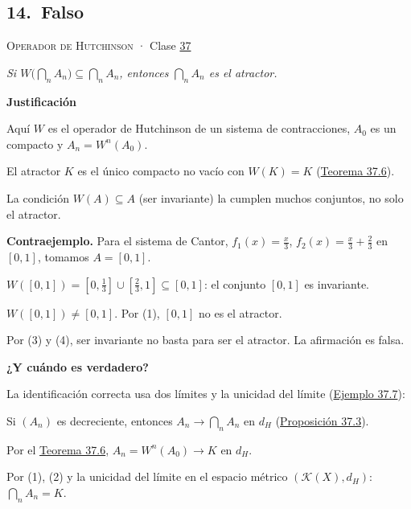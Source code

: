 \documentclass[11pt,a4paper]{article}
\newcommand{\bloque}[1]{\par\smallskip\noindent\textbf{\color{acento}#1}\par}
\begin{document}
\subsection*{\hypertarget{r-14}{}14.\ \textcolor{bad}{Falso}}
{\small \textsc{Operador de Hutchinson} · Clase \href{https://decostruttivismo.github.io/MAT2514-repaso/pdf/MAT2514_apuntes_completos.pdf\#nameddest=section.37}{37}}\par
\emph{Si $W\bigl(\bigcap_nA_n\bigr)\subseteq\bigcap_nA_n$, entonces $\bigcap_nA_n$ es el atractor.}
\bloque{Justificación}
\begin{pasos}
\item[] Aquí $W$ es el operador de Hutchinson de un sistema de contracciones, $A_0$ es un compacto y $A_n=W^n(A_0)$.
\item[(1)] El atractor $K$ es el único compacto no vacío con $W(K)=K$ (\href{https://decostruttivismo.github.io/MAT2514-repaso/pdf/MAT2514_apuntes_completos.pdf\#nameddest=teorema.37.6}{Teorema 37.6}).
\item[(2)] La condición $W(A)\subseteq A$ (ser invariante) la cumplen muchos conjuntos, no solo el atractor.
\item[] \textbf{Contraejemplo.} Para el sistema de Cantor, $f_1(x)=\frac x3$, $f_2(x)=\frac x3+\frac23$ en $[0,1]$, tomamos $A=[0,1]$.
\item[(3)] $W([0,1])=[0,\frac13]\cup[\frac23,1]\subseteq[0,1]$: el conjunto $[0,1]$ es invariante.
\item[(4)] $W([0,1])\ne[0,1]$. Por (1), $[0,1]$ no es el atractor.
\item[] Por (3) y (4), ser invariante no basta para ser el atractor. La afirmación es falsa.
\end{pasos}
\bloque{¿Y cuándo es verdadero?}
\begin{pasos}
\item[] La identificación correcta usa dos límites y la unicidad del límite (\href{https://decostruttivismo.github.io/MAT2514-repaso/pdf/MAT2514_apuntes_completos.pdf\#nameddest=teorema.37.7}{Ejemplo 37.7}):
\item[(1)] Si $(A_n)$ es decreciente, entonces $A_n\to\bigcap_nA_n$ en $d_H$ (\href{https://decostruttivismo.github.io/MAT2514-repaso/pdf/MAT2514_apuntes_completos.pdf\#nameddest=teorema.37.3}{Proposición 37.3}).
\item[(2)] Por el \href{https://decostruttivismo.github.io/MAT2514-repaso/pdf/MAT2514_apuntes_completos.pdf\#nameddest=teorema.37.6}{Teorema 37.6}, $A_n=W^n(A_0)\to K$ en $d_H$.
\item[] Por (1), (2) y la unicidad del límite en el espacio métrico $(\mathcal K(X),d_H)$: $\bigcap_nA_n=K$.
\end{pasos}
\end{document}
